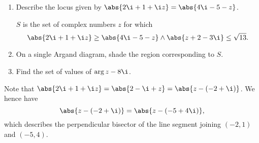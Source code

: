 \begin{problem}
    \begin{enumerate}
        \item Describe the locus given by $\abs{2\i + 1 + \i z} = \abs{4\i - 5 - z}$.

        $S$ is the set of complex numbers $z$ for which \[\abs{2\i + 1 + \i z} \geq \abs{4\i - 5 - z} \land \abs{z + 2 - 3\i} \leq \sqrt{13}.\]
        \item On a single Argand diagram, shade the region corresponding to $S$.
        \item Find the set of values of $\arg{z - 8\i}$.
    \end{enumerate}
\end{problem}
\begin{solution}
    \begin{ppart}
        Note that $\abs{2\i + 1 + \i z} = \abs{2 - \i + z} = \abs{z - (-2 + \i)}$. We hence have \[\abs{z - (-2 + \i)} = \abs{z - (-5 + 4\i)},\] which describes the perpendicular bisector of the line segment joining $(-2, 1)$ and $(-5, 4)$.
    \end{ppart}
    \clearpage
    \begin{ppart}
        \begin{center}
\end{center}
\end{ppart}
\end{solution}
